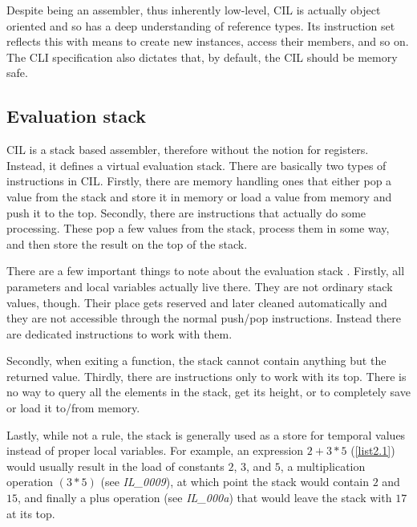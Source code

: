 Despite being an assembler, thus inherently low-level, CIL is actually object oriented and so has a deep understanding of reference types. Its instruction set reflects this with means to create new instances, access their members, and so on. The CLI specification also dictates that, by default, the CIL should be memory safe. 

\subsection{Evaluation stack}

CIL is a stack based assembler, therefore without the notion for registers. Instead, it defines a virtual evaluation stack. There are basically two types of instructions in CIL. Firstly, there are memory handling ones that either pop a value from the stack and store it in memory or load a value from memory and push it to the top. Secondly, there are instructions that actually do some processing. These pop a few values from the stack, process them in some way, and then store the result on the top of the stack.

There are a few important things to note about the evaluation stack \citep[Sec. I.12.4]{CLIEcma}. Firstly, all parameters and local variables actually live there. They are not ordinary stack values, though. Their place gets reserved and later cleaned automatically and they are not accessible through the normal push/pop instructions. Instead there are dedicated instructions to work with them.

Secondly, when exiting a function, the stack cannot contain anything but the returned value. Thirdly, there are instructions only to work with its top. There is no way to query all the elements in the stack, get its height, or to completely save or load it to/from memory.

Lastly, while not a rule, the stack is generally used as a store for temporal values instead of proper local variables. For example, an expression $2 + 3 * 5$ (\autoref{list2.1}) would usually result in the load of constants $2$, $3$, and $5$, a multiplication operation $(3 * 5)$ (see \emph{IL\_0009}), at which point the stack would contain $2$ and $15$, and finally a plus operation (see \emph{IL\_000a}) that would leave the stack with $17$ at its top.

